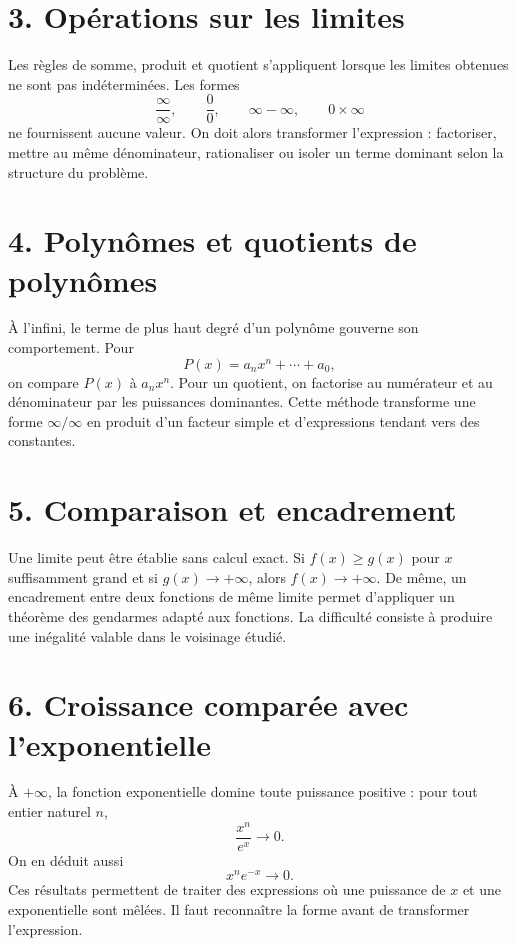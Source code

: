 
\section{3. Opérations sur les limites}
Les règles de somme, produit et quotient s'appliquent lorsque les limites obtenues ne sont pas indéterminées. Les formes
\[
\frac{\infty}{\infty},\qquad \frac00,\qquad \infty-\infty,\qquad 0\times\infty
\]
ne fournissent aucune valeur. On doit alors transformer l'expression : factoriser, mettre au même dénominateur, rationaliser ou isoler un terme dominant selon la structure du problème.

\section{4. Polynômes et quotients de polynômes}
À l'infini, le terme de plus haut degré d'un polynôme gouverne son comportement. Pour
\[
P(x)=a_nx^n+\cdots+a_0,
\]
on compare $P(x)$ à $a_nx^n$. Pour un quotient, on factorise au numérateur et au dénominateur par les puissances dominantes. Cette méthode transforme une forme $\infty/\infty$ en produit d'un facteur simple et d'expressions tendant vers des constantes.

\section{5. Comparaison et encadrement}
Une limite peut être établie sans calcul exact. Si $f(x)\ge g(x)$ pour $x$ suffisamment grand et si $g(x)\to+\infty$, alors $f(x)\to+\infty$. De même, un encadrement entre deux fonctions de même limite permet d'appliquer un théorème des gendarmes adapté aux fonctions. La difficulté consiste à produire une inégalité valable dans le voisinage étudié.


\section{6. Croissance comparée avec l’exponentielle}
À $+\infty$, la fonction exponentielle domine toute puissance positive : pour tout entier naturel $n$,
\[
\frac{x^n}{e^x}\to0.
\]
On en déduit aussi
\[
x^ne^{-x}\to0.
\]
Ces résultats permettent de traiter des expressions où une puissance de $x$ et une exponentielle sont mêlées. Il faut reconnaître la forme avant de transformer l'expression.

